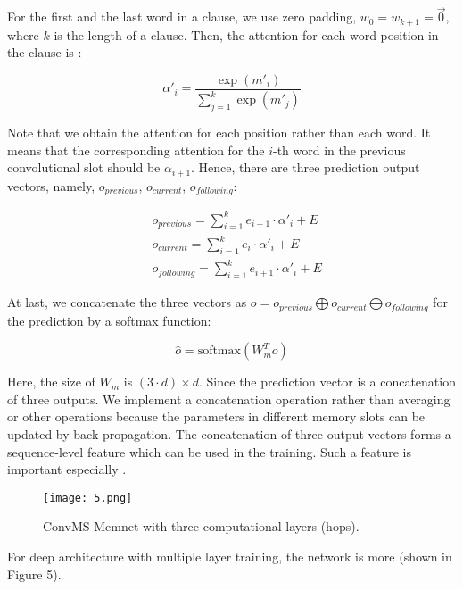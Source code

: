\documentclass[11pt,letterpaper]{article}
\begin{document}
\begin{CJK*}{UTF8}{gbsn}
For the first and the last word in a clause, we use zero padding, $w_0 = w_{k+1} = \vec 0$, where $k$ is the length of a clause. Then, the attention  for each word position in the clause is :
 
\begin{equation}
\alpha'_i = \frac { \exp { \left(m'_i\right) }} {\sum_{j=1}^k \exp \left({m'_j} \right)}
\end{equation}

Note that we obtain the attention for each position rather than each word. It means that the corresponding attention for the $i$-th word in the previous convolutional slot should be $\alpha_{i+1}$. Hence, there are three prediction output vectors, namely, $o_{previous}$, $o_{current}$, $o_{following}$:

\begin{align}
&o_{previous} = \sum_{i=1}^k e_{i-1} \cdot \alpha'_i + E \\
&o_{current} = \sum_{i=1}^k e_i \cdot \alpha'_i + E \\
&o_{following} = \sum_{i=1}^k e_{i+1} \cdot \alpha'_i + E
\end{align}

At last, we concatenate the three vectors as $o = o_{previous} \bigoplus o_{current} \bigoplus o_{following} $ for the prediction by a softmax function:

\begin{equation}
\hat{o} = \mbox{softmax} \left( W_m^T  o  \right) 
\end{equation}

Here, the size of $W_m$ is $ \left( 3 \cdot d \right) \times d $. Since the prediction vector is a concatenation of three outputs. We implement a concatenation operation rather than averaging or other operations because the parameters in different memory slots can be updated  by back propagation. The concatenation of three output vectors forms a sequence-level feature which can be used in the training. Such a feature is important especially .


\begin{figure}[htbp]
\label{fig:figure5}
\texttt{[image: 5.png]}
\caption{ConvMS-Memnet with three computational layers (hops).}
\end{figure}

For deep architecture with multiple layer training, the network is more 
(shown in Figure 5). 


\end{CJK*}
\end{document}
